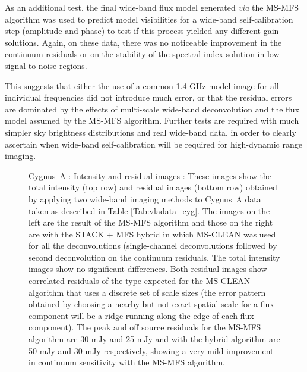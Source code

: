 \documentclass[structabstract]{stylefiles/aa}
\begin{document}
As an additional test, the final wide-band flux model generated {\it via} the
MS-MFS algorithm was used to predict model visibilities for a 
wide-band self-calibration step (amplitude and phase) to test
if this process yielded any different gain solutions.
Again, on these data, there was no noticeable improvement in the continuum residuals 
or on the stability of the spectral-index solution in low signal-to-noise regions.

This suggests that either the use of a common 1.4 GHz model image for 
all individual frequencies did not introduce much error, or that the residual
errors are dominated by the effects of multi-scale wide-band deconvolution
and the flux model assumed by the MS-MFS algorithm.  Further tests are required with
much simpler sky brightness distributions and real wide-band data, in order to clearly
ascertain when wide-band self-calibration will be required for high-dynamic range
imaging.




\begin{figure}[t!]
\begin{center}
\end{center}
\caption[Cygnus~A : Intensity and residual images]
{\small Cygnus~A : Intensity and residual images : 
These images show the total intensity (top row) and residual images (bottom row)
obtained by applying two wide-band imaging methods to Cygnus~A data taken
as described in Table \ref{Tab:vladata_cyg}.
The images on the left are the result of the MS-MFS algorithm and those on 
the right are with the STACK + MFS hybrid in which MS-CLEAN was used for all the
deconvolutions (single-channel deconvolutions followed by 
second deconvolution on the continuum residuals. 
The total intensity images show no significant differences. 
Both residual images show correlated residuals of the type expected for 
the MS-CLEAN algorithm that uses a discrete set of scale sizes
(the error pattern obtained by choosing a nearby but not exact spatial scale
 for a flux component will be a ridge running along the edge of each flux component).
The peak and off source residuals for the MS-MFS algorithm are
30 mJy and 25 mJy and with the hybrid algorithm are 50 mJy and 30 mJy 
respectively, showing a very mild improvement in continuum sensitivity
with the MS-MFS algorithm.
}
\label{Fig:cyga_intres}
\end{figure}
\end{document}
